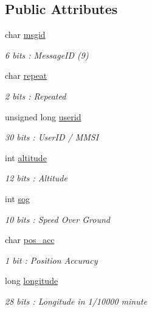 \subsection*{Public Attributes}
\begin{DoxyCompactItemize}
\item 
char \mbox{\hyperlink{structaismsg__9_a2b2c8b45668ed080ba65705f0a3000ce}{msgid}}
\begin{DoxyCompactList}\small\item\em 6 bits \+: Message\+ID (9) \end{DoxyCompactList}\item 
char \mbox{\hyperlink{structaismsg__9_a1e94f7d421b46a4e7e308cc92c78d03f}{repeat}}
\begin{DoxyCompactList}\small\item\em 2 bits \+: Repeated \end{DoxyCompactList}\item 
unsigned long \mbox{\hyperlink{structaismsg__9_a59d55a49e7c75c17c37d407c6fa7cf8d}{userid}}
\begin{DoxyCompactList}\small\item\em 30 bits \+: User\+ID / M\+M\+SI \end{DoxyCompactList}\item 
int \mbox{\hyperlink{structaismsg__9_a6b2d1659d3ad3df8c1bb77646a5c6bf7}{altitude}}
\begin{DoxyCompactList}\small\item\em 12 bits \+: Altitude \end{DoxyCompactList}\item 
int \mbox{\hyperlink{structaismsg__9_ab9dd43a3ac0d1e6508cf7e54ccff26f0}{sog}}
\begin{DoxyCompactList}\small\item\em 10 bits \+: Speed Over Ground \end{DoxyCompactList}\item 
char \mbox{\hyperlink{structaismsg__9_a099a7480fa8b032cbdb7fd587ec0130e}{pos\+\_\+acc}}
\begin{DoxyCompactList}\small\item\em 1 bit \+: Position Accuracy \end{DoxyCompactList}\item 
long \mbox{\hyperlink{structaismsg__9_a635359dcddfaee8c8dbdef4a1054165e}{longitude}}
\begin{DoxyCompactList}\small\item\em 28 bits \+: Longitude in 1/10000 minute \end{DoxyCompactList}\item 

\end{DoxyCompactItemize}
